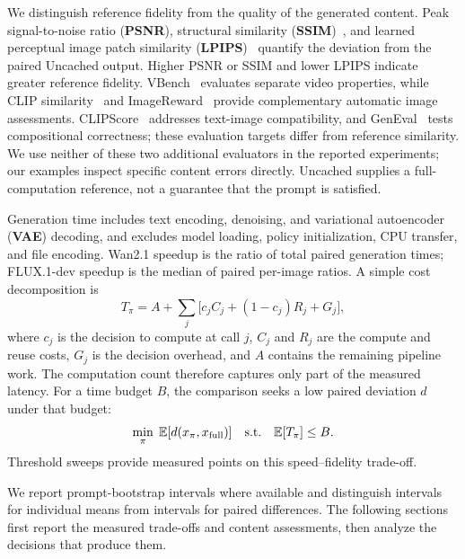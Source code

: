\documentclass[10pt,twocolumn,letterpaper]{article}
\begin{document}
We distinguish reference fidelity from the quality of the generated content.
Peak signal-to-noise ratio (\textbf{PSNR}), structural similarity (\textbf{SSIM})~\cite{wang2004ssim}, and learned perceptual image patch similarity (\textbf{LPIPS})~\cite{zhang2018lpips} quantify the deviation from the paired Uncached output.
Higher PSNR or SSIM and lower LPIPS indicate greater reference fidelity.
VBench~\cite{huang2024vbench} evaluates separate video properties, while CLIP similarity~\cite{radford2021clip} and ImageReward~\cite{xu2023imagereward} provide complementary automatic image assessments.
CLIPScore~\cite{hessel2021clipscore} addresses text-image compatibility, and GenEval~\cite{ghosh2023geneval} tests compositional correctness; these evaluation targets differ from reference similarity.
We use neither of these two additional evaluators in the reported experiments; our examples inspect specific content errors directly.
Uncached supplies a full-computation reference, not a guarantee that the prompt is satisfied.

Generation time includes text encoding, denoising, and variational autoencoder (\textbf{VAE}) decoding, and excludes model loading, policy initialization, CPU transfer, and file encoding.
Wan2.1 speedup is the ratio of total paired generation times; \mbox{FLUX.1-dev} speedup is the median of paired per-image ratios.
A simple cost decomposition is
\begin{equation}
T_\pi=A+\sum_j\big[c_jC_j+(1-c_j)R_j+G_j\big],
\label{eq:cost}
\end{equation}
where $c_j$ is the decision to compute at call $j$, $C_j$ and $R_j$ are the compute and reuse costs, $G_j$ is the decision overhead, and $A$ contains the remaining pipeline work.
The computation count therefore captures only part of the measured latency.
For a time budget $B$, the comparison seeks a low paired deviation $d$ under that budget:
\begin{equation}
\min_\pi\;\mathbb E[d(x_\pi,x_{\rm full})]
\quad\text{s.t.}\quad\mathbb E[T_\pi]\le B.
\end{equation}
Threshold sweeps provide measured points on this speed--fidelity trade-off.

We report prompt-bootstrap intervals where available and distinguish intervals for individual means from intervals for paired differences.
The following sections first report the measured trade-offs and content assessments, then analyze the decisions that produce them.
\begin{table}[t]
\caption{\textbf{FLUX comparisons at similar measured speedups on 200 DrawBench prompts.} Suffixes give cache thresholds or Fixed computation counts; Speedup is the median paired generation speedup and Compute the mean percentage of the 28 stages that are computed. Within each group, bold marks the best value per column and the shaded cell the lowest LPIPS, whose green number is its reduction relative to the second-lowest LPIPS in the group.}
\label{tab:flux}
\centering\small\setlength{\tabcolsep}{4pt}

\end{table}
\end{document}
